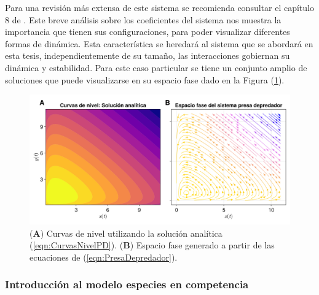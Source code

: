 Para una revisión más extensa de este sistema se recomienda consultar el capítulo 8 de \cite{hirsch2013differential}. Este breve análisis sobre los coeficientes del sistema nos muestra la importancia que tienen sus configuraciones, para poder visualizar diferentes formas de dinámica. Esta característica se heredará al sistema que se abordará en esta tesis, independientemente de su tamaño, las interacciones gobiernan su dinámica y estabilidad. Para este caso particular se tiene un conjunto amplio de soluciones que puede visualizarse en su espacio fase dado en la Figura (\ref{fig:CurvasNivelPD}).
\begin{figure}[h!]
	\centering
	\includegraphics[scale=0.23]{../Imagenes/Curvas de nivel PD}
	\caption{(\textbf{A}) Curvas de nivel utilizando la solución analítica (\ref{eqn:CurvasNivelPD}). (\textbf{B}) Espacio fase generado a partir de las ecuaciones de (\ref{eqn:PresaDepredador}).}
	\label{fig:CurvasNivelPD}
\end{figure}
\newpage


\subsubsection*{Introducción al modelo especies en competencia}


